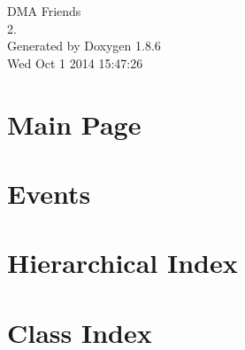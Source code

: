 \documentclass[twoside]{book}
\newcommand{\clearemptydoublepage}{%
  \newpage{\pagestyle{empty}\cleardoublepage}%
}
\begin{document}
\hypersetup{pageanchor=false}
\begin{titlepage}
\vspace*{7cm}
\begin{center}%
{\Large D\-M\-A Friends \\[1ex]\large 2. }\\
\vspace*{1cm}
{\large Generated by Doxygen 1.8.6}\\
\vspace*{0.5cm}
{\small Wed Oct 1 2014 15:47:26}\\
\end{center}
\end{titlepage}
\clearemptydoublepage
\tableofcontents
\clearemptydoublepage
{}
\hypersetup{pageanchor=true}

\chapter{Main Page}
\label{index}\hypertarget{index}{}
\chapter{Events}
\label{df/d0e/md_docs_EVENTS}
\hypertarget{df/d0e/md_docs_EVENTS}{}

\chapter{Hierarchical Index}

\chapter{Class Index}

\end{document}
